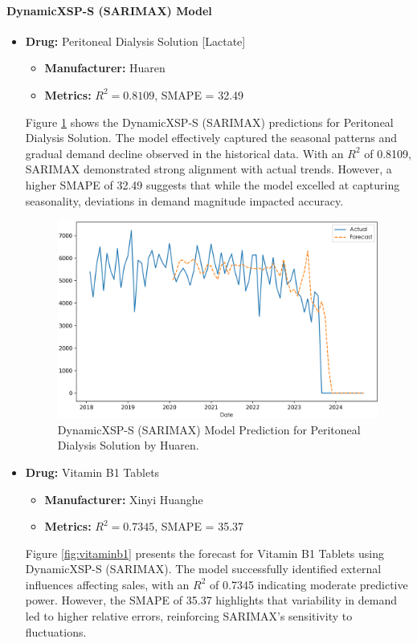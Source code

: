\documentclass[12pt]{article}
\begin{document}
\paragraph{DynamicXSP-S (SARIMAX) Model}
\begin{itemize}
\item \textbf{Drug:} Peritoneal Dialysis Solution [Lactate]
\begin{itemize}
\item \textbf{Manufacturer:} Huaren
\item \textbf{Metrics:} $R^2 = 0.8109$, SMAPE = 32.49
\end{itemize}
Figure \ref{fig:peritoneal} shows the DynamicXSP-S (SARIMAX) predictions for Peritoneal Dialysis Solution. The model effectively captured the seasonal patterns and gradual demand decline observed in the historical data. With an $R^2$ of 0.8109, SARIMAX demonstrated strong alignment with actual trends. However, a higher SMAPE of 32.49 suggests that while the model excelled at capturing seasonality, deviations in demand magnitude impacted accuracy.
\begin{figure}[H]
\centering
\includegraphics[width=\linewidth]{../Result_Paper/SARIMAX_Prediction_腹膜透析液[乳酸盐]_华仁.png}
\caption{DynamicXSP-S (SARIMAX) Model Prediction for Peritoneal Dialysis Solution by Huaren.}
\label{fig:peritoneal}
\end{figure}
\item \textbf{Drug:} Vitamin B1 Tablets
\begin{itemize}
\item \textbf{Manufacturer:} Xinyi Huanghe
\item \textbf{Metrics:} $R^2 = 0.7345$, SMAPE = 35.37
\end{itemize}
Figure \ref{fig:vitaminb1} presents the forecast for Vitamin B1 Tablets using DynamicXSP-S (SARIMAX). The model successfully identified external influences affecting sales, with an $R^2$ of 0.7345 indicating moderate predictive power. However, the SMAPE of 35.37 highlights that variability in demand led to higher relative errors, reinforcing SARIMAX’s sensitivity to fluctuations.

\end{itemize}
\end{document}
